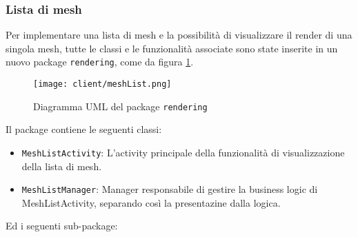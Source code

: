\subsubsection{Lista di mesh}
Per implementare una lista di mesh e la possibilità di visualizzare il render di una singola mesh, tutte le classi e le funzionalità associate sono state inserite in un nuovo package \texttt{rendering}, come da figura \ref{fig:meshList}.
\begin{figure}[!h] 
    \centering 
    \texttt{[image: client/meshList.png]} 
    \caption{Diagramma UML del package \texttt{rendering}}
   \label{fig:meshList}
\end{figure}
Il package contiene le seguenti classi:
\begin{itemize}
\item \texttt{MeshListActivity}: L'activity principale della funzionalità di visualizzazione della lista di mesh.
\item \texttt{MeshListManager}: Manager responsabile di gestire la business logic di MeshListActivity, separando così la presentazine dalla logica.
\end{itemize}
Ed i seguenti sub-package:
